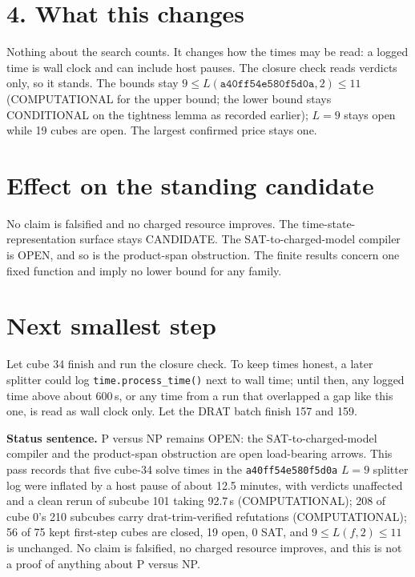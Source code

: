 \documentclass[11pt]{article}
\begin{document}
\section*{4. What this changes}
Nothing about the search counts. It changes how the times may be read: a logged time is wall clock and can include host pauses. The closure check reads verdicts only, so it stands. The bounds stay $9\le L(\texttt{a40ff54e580f5d0a},2)\le 11$ (COMPUTATIONAL for the upper bound; the lower bound stays CONDITIONAL on the tightness lemma as recorded earlier); $L=9$ stays open while 19 cubes are open. The largest confirmed price stays one.

\section*{Effect on the standing candidate}
No claim is falsified and no charged resource improves. The time-state-representation surface stays CANDIDATE. The SAT-to-charged-model compiler is OPEN, and so is the product-span obstruction. The finite results concern one fixed function and imply no lower bound for any family.

\section*{Next smallest step}
Let cube 34 finish and run the closure check. To keep times honest, a later splitter could log \texttt{time.process\_time()} next to wall time; until then, any logged time above about 600\,s, or any time from a run that overlapped a gap like this one, is read as wall clock only. Let the DRAT batch finish 157 and 159.

\bigskip
\noindent\textbf{Status sentence.} P versus NP remains OPEN: the SAT-to-charged-model compiler and the product-span obstruction are open load-bearing arrows. This pass records that five cube-34 solve times in the \texttt{a40ff54e580f5d0a} $L=9$ splitter log were inflated by a host pause of about 12.5 minutes, with verdicts unaffected and a clean rerun of subcube 101 taking 92.7\,s (COMPUTATIONAL); 208 of cube 0's 210 subcubes carry drat-trim-verified refutations (COMPUTATIONAL); 56 of 75 kept first-step cubes are closed, 19 open, 0 SAT, and $9\le L(f,2)\le 11$ is unchanged. No claim is falsified, no charged resource improves, and this is not a proof of anything about P versus NP.
\end{document}
